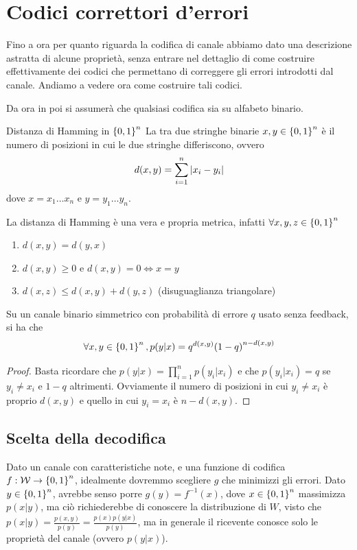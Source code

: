 \chapter{Codici correttori d'errori}

Fino a ora per quanto riguarda la codifica di canale abbiamo dato una descrizione astratta di alcune proprietà, senza entrare nel dettaglio di come costruire effettivamente dei codici che permettano di correggere gli errori introdotti dal canale.
Andiamo a vedere ora come costruire tali codici.

Da ora in poi si assumerà che qualsiasi codifica sia su alfabeto binario.

\begin{definition}{Distanza di Hamming in \(\set{0,1}^n\)}
  La  tra due stringhe binarie \(x,y \in \set{0,1}^n\) è il numero di posizioni in cui le due stringhe differiscono, ovvero
  \[d(x,y) = \sum_{i=1}^n \left|x_i - y_i\right|\]
  dove \(x=x_1\ldots x_n\) e \(y=y_1\ldots y_n\).
\end{definition}

La distanza di Hamming è una vera e propria metrica, infatti \(\forall x,y,z \in \set{0,1}^n\)
\begin{enumerate}
  \item \(d(x,y) = d(y,x)\)
  \item \(d(x,y) \geq 0\) e \(d(x,y) = 0 \iff x=y\)
  \item \(d(x,z) \leq d(x,y) + d(y,z)\) (disuguaglianza triangolare)
\end{enumerate}

\begin{proposition}{}
  Su un canale binario simmetrico con probabilità di errore \(q\) usato senza feedback, si ha che
  \[\forall x,y \in \set{0,1}^n, p(y|x) = q^{d(x,y)} {(1-q)}^{n-d(x,y)}\]
\end{proposition}
\begin{proof}
  Basta ricordare che \(p(y|x) = \prod_{i=1}^n p(y_i|x_i)\) e che \(p(y_i|x_i) = q\) se \(y_i \neq x_i\) e \(1-q\) altrimenti.
  Ovviamente il numero di posizioni in cui \(y_i \neq x_i\) è proprio \(d(x,y)\) e quello in cui \(y_i = x_i\) è \(n-d(x,y)\).
\end{proof}

\section{Scelta della decodifica}

Dato un canale con caratteristiche note, e una funzione di codifica \(f: \mathcal{W} \to \set{0,1}^n\), idealmente dovremmo scegliere \(g\) che minimizzi gli errori.
Dato \(y \in \set{0,1}^n\), avrebbe senso porre \(g(y) = f^{-1}(x)\), dove \(x\in\set{0,1}^n\) massimizza \(p(x|y)\), ma ciò richiederebbe di conoscere la distribuzione di \(W\), visto che \(p(x|y) = \frac{p(x,y)}{p(y)} = \frac{p(x)p(y|x)}{p(y)}\), ma in generale il ricevente conosce solo le proprietà del canale (ovvero \(p(y|x)\)).

